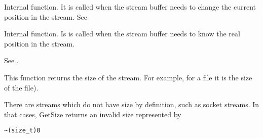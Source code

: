 

Internal function. It is called when the stream buffer needs to change the
current position in the stream. See 



Internal function. Is is called when the stream buffer needs to know the
real position in the stream.



See .

\label{wxstreambasegetsize}


This function returns the size of the stream. For example, for a file it is the size of
the file).


There are streams which do not have size by definition, such as socket streams.
In that cases, GetSize returns an invalid size represented by

\begin{verbatim}
~(size_t)0
\end{verbatim}

